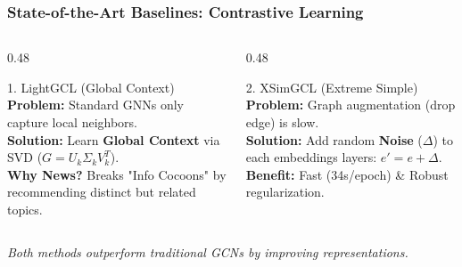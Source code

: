 \documentclass{beamer}
\begin{document}
\begin{frame}
    \frametitle{State-of-the-Art Baselines: Contrastive Learning}
    \begin{columns}[T]
        \begin{column}{0.48\textwidth}
            \begin{block}{1. LightGCL (Global Context)}
                \textbf{Problem:} Standard GNNs only capture local neighbors. \\
                \textbf{Solution:} Learn \textbf{Global Context} via SVD ($G = U_k \Sigma_k V_k^T$). \\
                \textbf{Why News?} Breaks "Info Cocoons" by recommending distinct but related topics.
            \end{block}
        \end{column}
        \begin{column}{0.48\textwidth}
            \begin{block}{2. XSimGCL (Extreme Simple)}
                \textbf{Problem:} Graph augmentation (drop edge) is slow. \\
                \textbf{Solution:} Add random \textbf{Noise} ($\Delta$) to each embeddings layers: $e' = e + \Delta$. \\
                \textbf{Benefit:} Fast (34s/epoch) \& Robust regularization.
            \end{block}
        \end{column}
    \end{columns}

    \vspace{0.2cm}
    \centering
    \small \textit{Both methods outperform traditional GCNs by improving representations.}
\end{frame}
\end{document}
